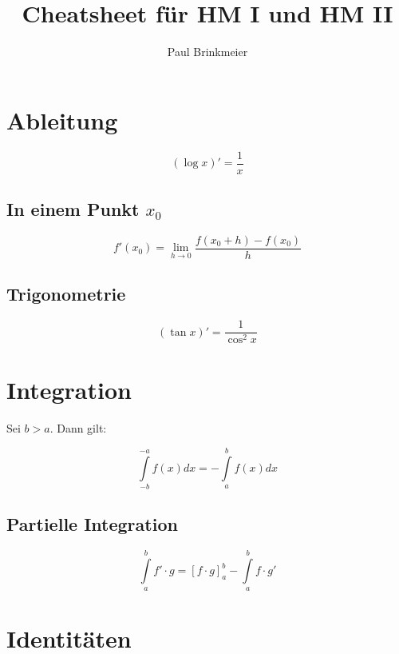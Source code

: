 \documentclass[a4paper, 16pt]{article}
\author{Paul Brinkmeier}
\title{Cheatsheet für HM I und HM II}
\begin{document}
	\maketitle
	\newpage
	\tableofcontents
	\newpage

	\section{Ableitung}

	\begin{equation*}
		(\log{x})' = \frac{1}{x}
	\end{equation*}

	\subsection{In einem Punkt $x_0$}

	\begin{equation*}
		f'(x_0) = \lim\limits_{h \to 0}{\frac{f(x_0 + h) - f(x_0)}{h}}
	\end{equation*}

	\subsection{Trigonometrie}

	\begin{equation*}
		(\tan{x})' = \frac{1}{\cos^2{x}}
	\end{equation*}

	\section{Integration}

	Sei $b > a$. Dann gilt:

	\begin{equation*}
		\int\limits_{-b}^{-a}{f(x)dx} = -\int\limits_{a}^{b}{f(x)dx}
	\end{equation*}

	\subsection{Partielle Integration}

	\begin{equation*}
		\int\limits_{a}^{b}{f' \cdot g} = \left[f \cdot g\right]_{a}^{b} - \int\limits_{a}^{b}{f \cdot g'}
	\end{equation*}

	\section{Identitäten}
\end{document}
